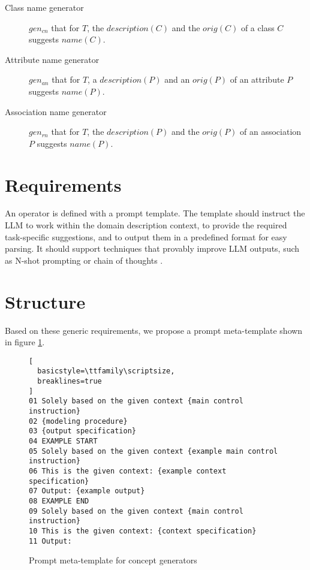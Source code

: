 \begin{description}
\item [Class name generator] $gen_{cn}$ that for $T$, the $description(C)$ and the $orig(C)$ of a class $C$ suggests  $name(C)$.

\item [Attribute name generator] $gen_{an}$ that for $T$,  a $description(P)$ and an $orig(P)$ of an attribute $P$ suggests $name(P)$.

\item [Association name generator] $gen_{rn}$ that for $T$, the $description(P)$ and the $orig(P)$ of an association $P$ suggests $name(P)$.
\end{description}


\section{Requirements}

An operator is defined with a prompt template. The template should instruct
the LLM to work within the domain description context, to provide the required
task-specific suggestions, and to output them in a predefined format for easy
parsing. It should support techniques that provably improve LLM outputs, such
as N-shot prompting \cite{Brown2020} or chain of thoughts \cite{Wei2022}.


\section{Structure}

Based on these generic requirements, we propose a prompt meta-template shown in figure \ref{fig:meta-templates}.

\begin{figure}[!h]
    \centering
\begin{lstlisting}[
  basicstyle=\ttfamily\scriptsize,
  breaklines=true
]
01 Solely based on the given context {main control instruction}
02 {modeling procedure}
03 {output specification}
04 EXAMPLE START
05 Solely based on the given context {example main control instruction}
06 This is the given context: {example context specification}
07 Output: {example output}
08 EXAMPLE END
09 Solely based on the given context {main control instruction}
10 This is the given context: {context specification}
11 Output:
\end{lstlisting}
    \caption{\centering Prompt meta-template for concept generators}
    \label{fig:meta-templates}
\end{figure}

